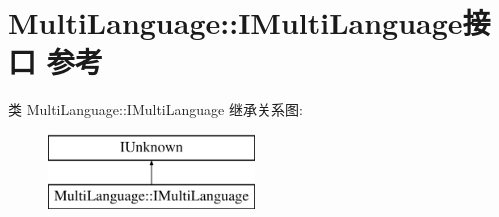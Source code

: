 \hypertarget{interface_multi_language_1_1_i_multi_language}{}\section{Multi\+Language\+:\+:I\+Multi\+Language接口 参考}
\label{interface_multi_language_1_1_i_multi_language}
类 Multi\+Language\+:\+:I\+Multi\+Language 继承关系图\+:\begin{figure}[H]
\begin{center}
\leavevmode
\includegraphics[height=2.000000cm]{interface_multi_language_1_1_i_multi_language}
\end{center}
\end{figure}
